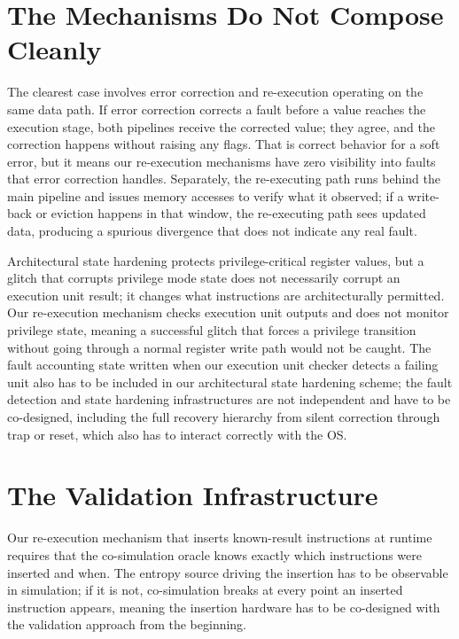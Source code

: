 \documentclass[12pt]{article}
\begin{document}
\section{The Mechanisms Do Not Compose Cleanly}

The clearest case involves error correction and re-execution operating on
the same data path. If error correction corrects a fault before a value
reaches the execution stage, both pipelines receive the corrected value;
they agree, and the correction happens without raising any flags. That
is correct behavior for a soft error, but it means our re-execution
mechanisms have zero visibility into faults that error correction
handles. Separately, the re-executing path runs behind the main pipeline
and issues memory accesses to verify what it observed; if a write-back
or eviction happens in that window, the re-executing path sees updated
data, producing a spurious divergence that does not indicate any real
fault.

Architectural state hardening protects privilege-critical register
values, but a glitch that corrupts privilege mode state does not
necessarily corrupt an execution unit result; it changes what
instructions are architecturally permitted. Our re-execution mechanism
checks execution unit outputs and does not monitor privilege state,
meaning a successful glitch that forces a privilege transition without
going through a normal register write path would not be caught. The
fault accounting state written when our execution unit checker detects a
failing unit also has to be included in our architectural state hardening
scheme; the fault detection and state hardening infrastructures are not
independent and have to be co-designed, including the full recovery
hierarchy from silent correction through trap or reset, which also has
to interact correctly with the OS.

\section{The Validation Infrastructure}

Our re-execution mechanism that inserts known-result instructions at
runtime requires that the co-simulation oracle knows exactly which
instructions were inserted and when. The entropy source driving the
insertion has to be observable in simulation; if it is not, co-simulation
breaks at every point an inserted instruction appears, meaning the
insertion hardware has to be co-designed with the validation approach
from the beginning.
\end{document}
